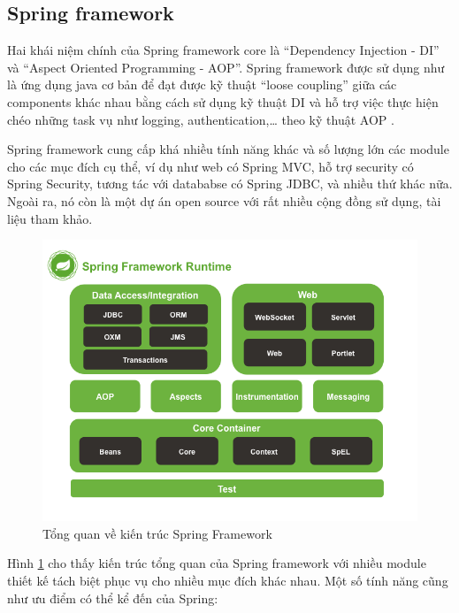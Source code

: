 \documentclass[12pt,a4paper,oneside]{extbook}
\begin{document}
\subsection{Spring framework}\label{spring}

Hai khái niệm chính của Spring framework core là “Dependency Injection - DI” và “Aspect Oriented Programming - AOP”. Spring framework được sử dụng như là ứng dụng java cơ bản để đạt được kỹ thuật “loose coupling” giữa các components khác nhau bằng cách sử dụng kỹ thuật DI và hỗ trợ việc thực hiện chéo những task vụ như logging, authentication,\dots\hspace{0mm} theo kỹ thuật AOP \cite{spring-questions}\cite{spring-home-page}.

Spring framework cung cấp khá nhiều tính năng khác và số lượng lớn các module cho các mục đích cụ thể, ví dụ như web có Spring MVC, hỗ trợ security có Spring Security, tương tác với datababse có Spring JDBC, và nhiều thứ khác nữa. Ngoài ra, nó còn là một dự án open source với rất nhiều cộng đồng sử dụng, tài liệu tham khảo.

\begin{figure}[h]
  \centering
     \includegraphics[width=12cm]{3-spring-framework-overview}
  \caption{Tổng quan về kiến trúc Spring Framework}\label{fig:3-spring-framework-overview}
\end{figure}

Hình \ref{fig:3-spring-framework-overview} cho thấy kiến trúc tổng quan của Spring framework với nhiều module thiết kế tách biệt phục vụ cho nhiều mục đích khác nhau. Một số tính năng cũng như ưu điểm có thể kể đến của Spring:
\end{document}
